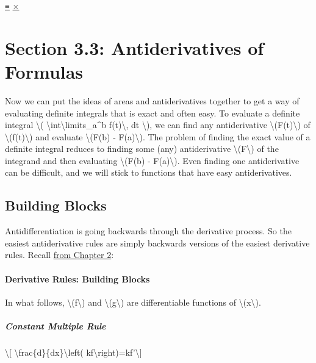 \protect\hyperlink{main-nav}{≡} \protect\hyperlink{close-nav}{×}

\hypertarget{section-3.3-antiderivatives-of-formulas}{%
\section{Section 3.3: Antiderivatives of
Formulas}\label{section-3.3-antiderivatives-of-formulas}}

Now we can put the ideas of areas and antiderivatives together to get a
way of evaluating definite integrals that is exact and often easy. To
evaluate a definite integral \textbackslash{}(
\textbackslash{}int\textbackslash{}limits\_a\^{}b f(t)\textbackslash{},
dt \textbackslash{}), we can find any antiderivative
\textbackslash{}(F(t)\textbackslash{}) of
\textbackslash{}(f(t)\textbackslash{}) and evaluate
\textbackslash{}(F(b) - F(a)\textbackslash{}). The problem of finding
the exact value of a definite integral reduces to finding some (any)
antiderivative \textbackslash{}(F\textbackslash{}) of the integrand and
then evaluating \textbackslash{}(F(b) - F(a)\textbackslash{}). Even
finding one antiderivative can be difficult, and we will stick to
functions that have easy antiderivatives.

\hypertarget{building-blocks}{%
\subsection{Building Blocks}\label{building-blocks}}

Antidifferentiation is going backwards through the derivative process.
So the easiest antiderivative rules are simply backwards versions of the
easiest derivative rules. Recall \href{../chapter2/section2-5.php}{from
Chapter 2}:

\hypertarget{derivative-rules-building-blocks}{%
\paragraph{Derivative Rules: Building
Blocks}\label{derivative-rules-building-blocks}}

In what follows, \textbackslash{}(f\textbackslash{}) and
\textbackslash{}(g\textbackslash{}) are differentiable functions of
\textbackslash{}(x\textbackslash{}).

\hypertarget{constant-multiple-rule}{%
\subparagraph{Constant Multiple Rule}\label{constant-multiple-rule}}

\textbackslash{}{[} \textbackslash{}frac\{d\}\{dx\}\textbackslash{}left(
kf\textbackslash{}right)=kf'\textbackslash{}{]}

